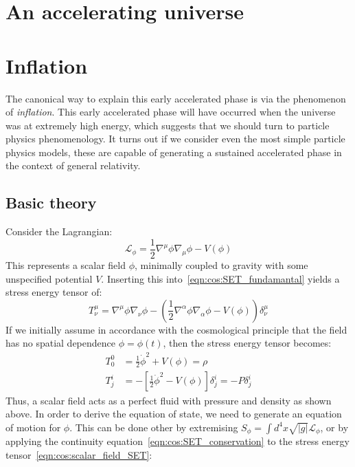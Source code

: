 \section{An accelerating universe}
\section{Inflation}
The canonical way to explain this early accelerated phase is via the phenomenon of {\em inflation}. This early accelerated phase will have occurred when the universe was at extremely high energy, which suggests that we should turn to particle physics phenomenology.
It turns out if we consider even the most simple particle physics models, these are capable of generating a sustained accelerated phase in the context of general relativity.

\subsection{Basic theory}
Consider the Lagrangian:
\begin{equation}
  \mathcal{L}_\phi = \frac{1}{2}\nabla^\mu\phi\nabla_\mu\phi - V(\phi) 
  \label{eqn:cos:scalar_field_lagrangian}
\end{equation}
This represents a scalar field $\phi$, minimally coupled to gravity with some unspecified potential $V$.  Inserting this into~\eqref{eqn:cos:SET_fundamantal} yields a stress energy tensor of:
\begin{equation}
  T^{\mu}_{\nu} = \nabla^\mu\phi\nabla_\nu\phi - \left( \frac{1}{2}\nabla^\alpha\phi \nabla_\alpha\phi - V(\phi)  \right)\delta^{\mu}_{\nu}
  \label{eqn:cos:scalar_field_SET}
\end{equation}
If we initially assume in accordance with the cosmological principle that the field has no spatial dependence $\phi = \phi(t)$, then the stress energy tensor becomes:
\begin{align}
  T^{0}_{0} &=\frac{1}{2}\dot\phi^2 + V(\phi) = \rho 
  \label{eqn:cos:scalar_field_rho}\\
  T^{i}_{j} &=-\left[ \frac{1}{2}\dot\phi^2 - V(\phi)\right]\delta^{i}_{j} = -P\delta^{i}_{j}
  \label{eqn:cos:scalar_field_P}
\end{align}
Thus, a scalar field acts as a perfect fluid with pressure and density as shown above. In order to derive the equation of state, we need to generate an equation of motion for $\phi$. This can be done other by extremising $S_\phi = \int d^4 x \sqrt{|g|} \mathcal{L}_\phi$, or by applying the continuity equation~\eqref{eqn:cos:SET_conservation} to the stress energy tensor~\eqref{eqn:cos:scalar_field_SET}: 
